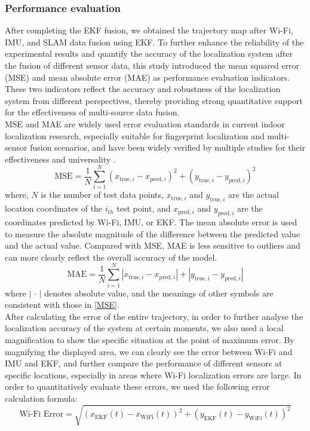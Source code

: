 \documentclass[12pt,a4paper]{article}
\numberwithin{equation}{section}
\begin{document}
\subsubsection{Performance evaluation}
After completing the EKF fusion, we obtained the trajectory map after Wi-Fi, IMU, and SLAM data fusion using EKF. To further enhance the reliability of the experimental results and quantify the accuracy of the localization system after the fusion of different sensor data, this study introduced the mean squared error (MSE) and mean absolute error (MAE) as performance evaluation indicators. These two indicators reflect the accuracy and robustness of the localization system from different perspectives, thereby providing strong quantitative support for the effectiveness of multi-source data fusion.\\
MSE and MAE are widely used error evaluation standards in current indoor localization research, especially suitable for fingerprint localization and multi-sensor fusion scenarios, and have been widely verified by multiple studies for their effectiveness and universality \cite{sun2019fusion, he2016wifi}.
\begin{equation}
\text{MSE} = \frac{1}{N} \sum_{i=1}^{N} \left( x_{\text{true}, i} - x_{\text{pred}, i} \right)^2 + \left( y_{\text{true}, i} - y_{\text{pred}, i} \right)^2
\label{MSE}
\end{equation}
where, $N$ is the number of test data points, $x_{\text{true}, i}$ and $y_{\text{true}, i}$ are the actual location coordinates of the $i_{th}$ test point, and $x_{\text{pred}, i}$ and $y_{\text{pred}, i}$ are the coordinates predicted by Wi-Fi, IMU, or EKF.
The mean absolute error is used to measure the absolute magnitude of the difference between the predicted value and the actual value. Compared with MSE, MAE is less sensitive to outliers and can more clearly reflect the overall accuracy of the model.
\begin{equation}
\text{MAE} = \frac{1}{N} \sum_{i=1}^{N} \left| x_{\text{true}, i} - x_{\text{pred}, i} \right| + \left| y_{\text{true}, i} - y_{\text{pred}, i} \right|
\label{MAE}
\end{equation}
where $\left| \,\cdot\, \right|$ denotes absolute value, and the meanings of other symbols are consistent with those in \autoref{MSE}.\\
After calculating the error of the entire trajectory, in order to further analyse the localization accuracy of the system at certain moments, we also used a local magnification to show the specific situation at the point of maximum error. By magnifying the displayed area, we can clearly see the error between Wi-Fi and IMU and EKF, and further compare the performance of different sensors at specific locations, especially in areas where Wi-Fi localization errors are large. In order to quantitatively evaluate these errors, we used the following error calculation formula:
\begin{equation}
\text{Wi-Fi Error} = \sqrt{(x_{\text{EKF}}(t) - x_{\text{WiFi}}(t))^2 + (y_{\text{EKF}}(t) - y_{\text{WiFi}}(t))^2}
\end{equation}
\end{document}
